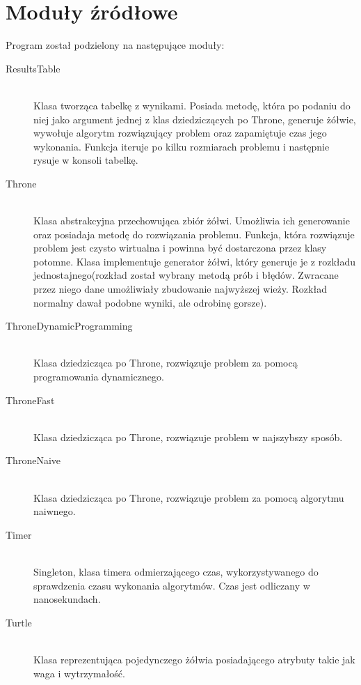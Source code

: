 \documentclass[11pt,a4paper]{article}
\begin{document}
\section{Moduły źródłowe}
Program został podzielony na następujące moduły:
\begin{description}
	\item[ResultsTable] \hfill \\ 
	Klasa tworząca tabelkę z wynikami. Posiada metodę, która po podaniu do niej jako argument jednej z klas dziedziczących po Throne, generuje żółwie, wywołuje algorytm rozwiązujący problem oraz zapamiętuje czas jego wykonania. Funkcja iteruje po kilku rozmiarach problemu i następnie rysuje w konsoli tabelkę.
	
	\item[Throne] \hfill \\  
	Klasa abstrakcyjna przechowująca zbiór żółwi. Umożliwia ich generowanie oraz posiadaja metodę do rozwiązania problemu. Funkcja, która rozwiązuje problem jest czysto wirtualna i powinna być dostarczona przez klasy potomne. Klasa implementuje generator żółwi, który generuje je z rozkładu jednostajnego(rozkład został wybrany metodą prób i błędów. Zwracane przez niego dane umożliwiały zbudowanie najwyższej wieży. Rozkład normalny dawał podobne wyniki, ale odrobinę gorsze).
	
	\item[ThroneDynamicProgramming] \hfill \\ 
	 Klasa dziedzicząca po Throne, rozwiązuje problem za pomocą programowania dynamicznego.
	 
	\item[ThroneFast] \hfill \\ 
	 Klasa dziedzicząca po Throne, rozwiązuje problem w najszybszy sposób.
	 
	\item[ThroneNaive] \hfill \\  
	 Klasa dziedzicząca po Throne, rozwiązuje problem za pomocą algorytmu naiwnego.
	 
	\item[Timer] \hfill \\ 
	 Singleton, klasa timera odmierzającego czas, wykorzystywanego do sprawdzenia czasu wykonania algorytmów. Czas jest odliczany w nanosekundach.
	 
	\item[Turtle] \hfill \\ 
	 Klasa reprezentująca pojedynczego żółwia posiadającego atrybuty takie jak waga i wytrzymałość.
\end{description}
\end{document}
